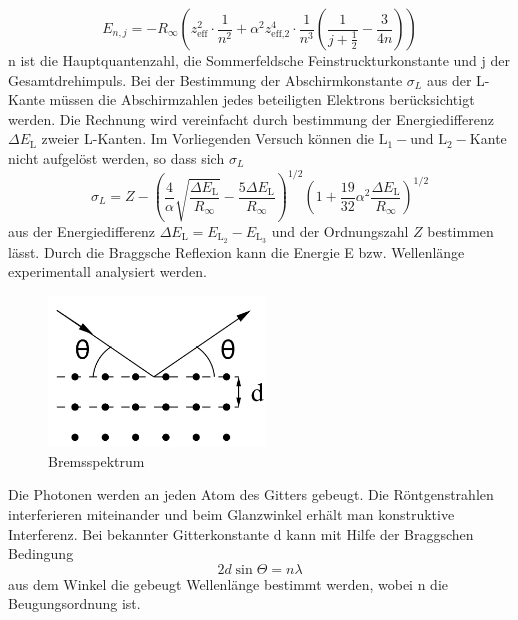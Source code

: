 \begin{equation}
    E_{n,j} = -R_{\infty}\left(z_{\text{eff}}^2 \cdot \frac{1}{n^2} + \alpha^2 z_{\text{eff,2}}^4 \cdot \frac{1}{n^3} \left( \frac{1}{j + \frac{1}{2}} - \frac{3}{4n}\right)\right)
    \label{eqn:gl3}
\end{equation}
n ist die Hauptquantenzahl, \alpha die Sommerfeldsche Feinstruckturkonstante und j der Gesamtdrehimpuls.
Bei der Bestimmung der Abschirmkonstante ${\sigma}_L$ aus der L-Kante müssen die Abschirmzahlen jedes beteiligten Elektrons berücksichtigt werden.
Die Rechnung wird vereinfacht durch bestimmung der Energiedifferenz $\Delta E_{\text{L}}$ zweier L-Kanten.
Im Vorliegenden Versuch können die $\text{L}_1- \text{und L}_2-$Kante nicht aufgelöst werden, so dass sich ${\sigma}_L$
\begin{equation}
    {\sigma}_L = Z - \left(\frac{4}{\alpha}\sqrt{\frac{\Delta E_{\text{L}}}{R_{\infty}}} - \frac{5 \Delta E_{\text{L}}}{R_{\infty}}\right)^{1/2}\left(1 + \frac{19}{32}\alpha^2\frac{\Delta E_{\text{L}}}{R_{\infty}}\right)^{1/2}
    \label{eqn:gl3}
\end{equation}
aus der Energiedifferenz $\Delta E_{\text{L}} = E_{\text{$\text{L}_2$}} - E_{\text{$\text{L}_3$}}$ und der Ordnungszahl $Z$ bestimmen lässt.
Durch die Braggsche Reflexion kann die Energie E bzw. Wellenlänge \lambda experimentall analysiert werden.
\begin{figure}
    \centering
    \includegraphics[height=4.0cm]{data/abb3.jpg}
    \caption{Bremsspektrum \cite{V602}}
    \label{fig:abb1}
\end{figure}
Die Photonen werden an jeden Atom des Gitters gebeugt.
Die Röntgenstrahlen interferieren miteinander und beim Glanzwinkel \Theta erhält man konstruktive Interferenz.
Bei bekannter Gitterkonstante d kann mit Hilfe der Braggschen Bedingung
\begin{equation}
    2 d \sin{\Theta} = n \lambda
\end{equation}
aus dem Winkel \Theta die gebeugt Wellenlänge \lambda bestimmt werden, wobei n die Beugungsordnung ist.
